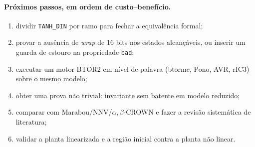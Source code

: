 \documentclass[12pt,openright,oneside,a4paper,chapter=TITLE,sumario=tradicional,english,brazil]{abntex2}
\begin{document}
\paragraph{Próximos passos, em ordem de custo--benefício.}
\begin{enumerate}
  \item dividir \texttt{TANH\_DIN} por ramo para fechar a equivalência formal;
  \item provar a ausência de \emph{wrap} de 16 bits nos estados alcançáveis, ou inserir um guarda de estouro na propriedade \texttt{bad};
  \item executar um motor BTOR2 em nível de palavra (btormc, Pono, AVR, rIC3) sobre o mesmo modelo;
  \item obter uma prova não trivial: invariante sem batente em modelo reduzido;
  \item comparar com Marabou/NNV/$\alpha,\beta$-CROWN e fazer a revisão sistemática de literatura;
  \item validar a planta linearizada e a região inicial contra a planta não linear.
\end{enumerate}
\end{document}
